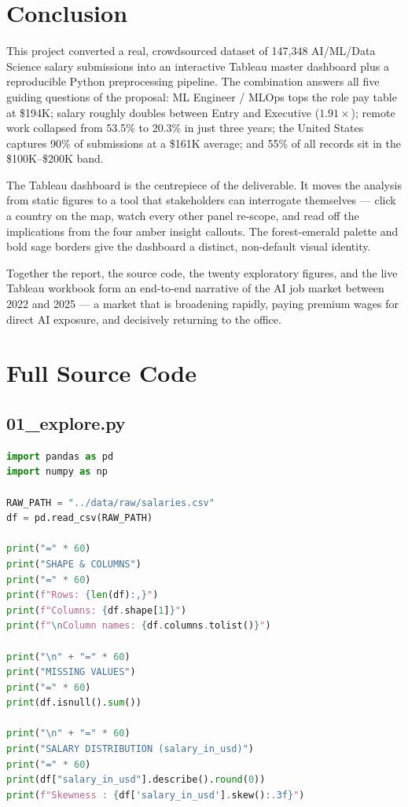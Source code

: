 \documentclass[11pt,a4paper,oneside]{report}
\begin{document}
\chapter{Conclusion}

This project converted a real, crowdsourced dataset of 147,348 AI/ML/Data Science salary submissions into an interactive Tableau master dashboard plus a reproducible Python preprocessing pipeline. The combination answers all five guiding questions of the proposal: ML Engineer / MLOps tops the role pay table at \$194K; salary roughly doubles between Entry and Executive ($1.91\times$); remote work collapsed from 53.5\% to 20.3\% in just three years; the United States captures 90\% of submissions at a \$161K average; and 55\% of all records sit in the \$100K--\$200K band.

The Tableau dashboard is the centrepiece of the deliverable. It moves the analysis from static figures to a tool that stakeholders can interrogate themselves --- click a country on the map, watch every other panel re-scope, and read off the implications from the four amber insight callouts. The forest-emerald palette and bold sage borders give the dashboard a distinct, non-default visual identity.

Together the report, the source code, the twenty exploratory figures, and the live Tableau workbook form an end-to-end narrative of the AI job market between 2022 and 2025 --- a market that is broadening rapidly, paying premium wages for direct AI exposure, and decisively returning to the office.

\appendix
\chapter{Full Source Code}

\section{01\_explore.py}
\begin{lstlisting}[language=Python]
import pandas as pd
import numpy as np

RAW_PATH = "../data/raw/salaries.csv"
df = pd.read_csv(RAW_PATH)

print("=" * 60)
print("SHAPE & COLUMNS")
print("=" * 60)
print(f"Rows: {len(df):,}")
print(f"Columns: {df.shape[1]}")
print(f"\nColumn names: {df.columns.tolist()}")

print("\n" + "=" * 60)
print("MISSING VALUES")
print("=" * 60)
print(df.isnull().sum())

print("\n" + "=" * 60)
print("SALARY DISTRIBUTION (salary_in_usd)")
print("=" * 60)
print(df["salary_in_usd"].describe().round(0))
print(f"Skewness : {df['salary_in_usd'].skew():.3f}")
\end{lstlisting}
\end{document}
